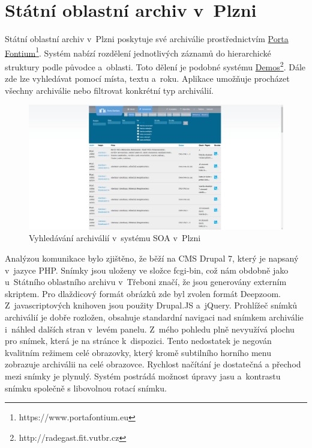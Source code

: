 \newpage
\section{Státní oblastní archiv v~Plzni}
Státní oblastní archiv v~Plzni poskytuje své archiválie prostřednictvím \href{https://www.portafontium.eu}{Porta Fontium}\footnote{https://www.portafontium.eu}. Systém nabízí rozdělení jednotlivých záznamů do hierarchické struktury podle původce a~oblasti. Toto dělení je podobné systému \href{http://radegast.fit.vutbr.cz/}{Demos}\footnote{http://radegast.fit.vutbr.cz}. 
Dále zde lze vyhledávat pomocí místa, textu a~roku. Aplikace umožňuje procházet všechny archiválie nebo filtrovat konkrétní typ archiválií.

\begin{figure}[htbp]
\centering
    \includegraphics[scale=.2]{obrazky-figures/archives/soaPlzen/vyhledani.png}
    \caption{Vyhledávání archiválií v~systému SOA v~Plzni}
\end{figure}

\noindent
Analýzou komunikace bylo zjištěno, že běží na CMS Drupal 7, který je napsaný v~jazyce PHP. Snímky jsou uloženy ve složce fcgi-bin, což nám obdobně jako u~Státního oblastního archivu v~Třeboni značí, že jsou generovány externím skriptem. Pro dlaždicový formát obrázků zde byl zvolen formát Deepzoom. Z~javascriptových knihoven jsou použity Drupal.JS a~jQuery. 
\newpara
Prohlížeč snímků archiválií je dobře rozložen, obsahuje standardní navigaci nad snímkem archiválie i~náhled dalších stran v~levém panelu. Z~mého pohledu plně nevyužívá plochu pro snímek, která je na stránce k~dispozici. Tento nedostatek je negován kvalitním režimem celé obrazovky, který kromě subtilního horního menu zobrazuje archiválii na celé obrazovce. Rychlost načítání je dostatečná a přechod mezi snímky je plynulý. Systém postrádá možnost úpravy jasu a~kontrastu snímku společně s libovolnou rotací snímku.

